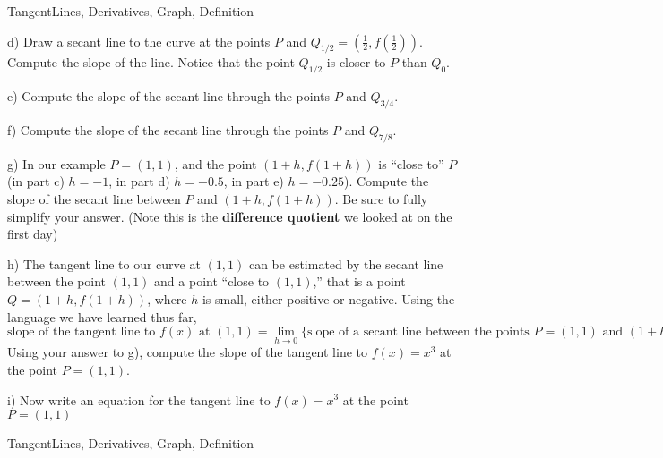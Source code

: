 \begin{tagblock}{TangentLines, Derivatives, Graph, Definition}
\begin{question}
\vspace{.75in}

d) Draw a secant line to the curve at the points $P$ and $Q_{1/2} =  (\frac{1}{2}, f(\frac{1}{2}))$.  Compute the slope of the line.  Notice that the point $Q_{1/2}$ is closer to $P$ than $Q_0$.

\vspace{.75in}

e)  Compute the slope of the secant line through the points $P$ and $Q_{3/4}$. 


\vspace{.75in}

f)  Compute the slope of the secant line through the points $P$ and $Q_{7/8}$. 

\vspace{.75in}

g) In our example $P=(1,1)$, and the point $(1 + h, f(1+ h))$ is ``close to'' $P$ (in part c) $h=-1$, in part d) $h=-0.5$, in part e) $h=-0.25$).   Compute the slope of the secant line between $P$ and $(1 + h, f(1+ h))$.   Be sure to fully simplify your answer.  (Note this is the \textbf{difference quotient} we looked at on the first day)
\vspace{1.5in}

 h) The tangent line to our curve at $(1,1)$ can be estimated by the secant line between the point $(1,1)$ and a point ``close to $(1,1)$,'' that is a point $Q=(1+h, f(1+h) )$, where $h$ is small, either positive or negative.    Using the language we have learned thus far, 
 \[ \text{slope of the tangent line to $f(x)$ at }(1,1) = \lim_{h \to 0} \{ \text{slope of a secant line between the points $P=(1,1)$ and $(1+h, f(1+h) )$} \} \]
 Using your answer to g), compute the slope of the tangent line to $f(x) = x^3$ at the point $P=(1,1)$.


 
 \vspace{1in}
 i) Now write an equation for the tangent line to $f(x)=x^3$ at the point $P=(1,1)$
  
 \vspace{.5in}

\bigskip


	
	
\begin{tags}
	    TangentLines, Derivatives, Graph, Definition
\end{tags}
	
\begin{diary}
\end{diary}
	
\begin{solution}
	   
\end{solution}
	
\end{question}

\end{tagblock}

